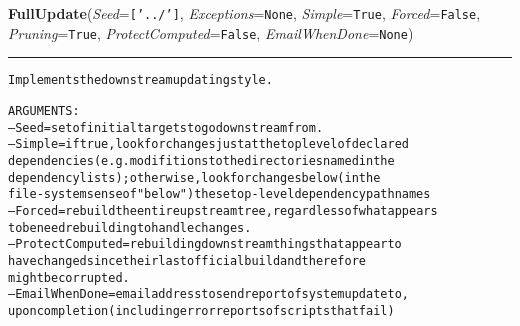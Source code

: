\hspace{.8\funcindent}\begin{boxedminipage}{\funcwidth}

    \raggedright \textbf{FullUpdate}(\textit{Seed}={\tt ['../']}, \textit{Exceptions}={\tt None}, \textit{Simple}={\tt True}, \textit{Forced}={\tt False}, \textit{Pruning}={\tt True}, \textit{ProtectComputed}={\tt False}, \textit{EmailWhenDone}={\tt None})

    \vspace{-1.5ex}

    \rule{\textwidth}{0.5\fboxrule}
\setlength{\parskip}{2ex}
\begin{alltt}

Implements the downstream updating style.

ARGUMENTS:
--Seed = set of initial targets to go downstream from.  
--Simple = if true, look for changes just at the top level of declared 
        dependencies (e.g. modifitions to the directories named in the
        dependency lists);  otherwise, look for changes below (in the
        file-system sense of "below") these top-level dependency path names
--Forced = rebuild the entire upstream tree, regardless of what appears 
        to be need rebuilding to handle changes. 
--ProtectComputed = rebuilding downstream things that appear to 
        have changed since their last official build and therefore 
        might be corrupted.
--EmailWhenDone = email address to send report of system update to,
        upon completion (including error reports of scripts that fail)
\end{alltt}

\setlength{\parskip}{1ex}
    \end{boxedminipage}

    \label{System:Update:FindOutWhatWillUpdate}

    \vspace{0.5ex}

